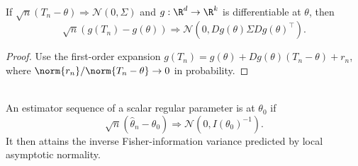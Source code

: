 \begin{proposition} \label{prop:delta-method} \\
If $\sqrt{n}(T_n-\theta)\Rightarrow\mathcal{N}(0,\Sigma)$ and $g:\R^d\to\R^k$ is differentiable at $\theta$, then
\[
\sqrt{n}(g(T_n)-g(\theta))
\Rightarrow\mathcal{N}(0,Dg(\theta)\Sigma Dg(\theta)^\top).
\]
\begin{proof}
Use the first-order expansion $g(T_n)=g(\theta)+Dg(\theta)(T_n-\theta)+r_n$, where $\norm{r_n}/\norm{T_n-\theta}\to0$ in probability.
\end{proof}
\end{proposition}

\begin{definition} \label{def:asymptotic-efficiency} \\
An estimator sequence of a scalar regular parameter is  at $\theta_0$ if
\[
\sqrt{n}(\widehat{\theta}_n-\theta_0)\Rightarrow
\mathcal{N}(0,I(\theta_0)^{-1}).
\]
It then attains the inverse Fisher-information variance predicted by local asymptotic normality.
\end{definition}
